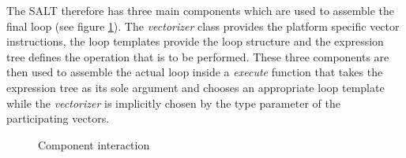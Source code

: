 \documentclass[12pt]{article}
\begin{document}
The SALT therefore has three main components which are used to assemble
the final loop (see figure \ref{components}). The \emph{vectorizer} class provides the platform specific
vector instructions, the loop templates provide the loop structure and the
expression tree defines the operation that is to be performed. These three
components are then used to assemble the actual loop inside a \emph{execute}
function that takes the expression tree as its sole argument and chooses
an appropriate loop template while the \emph{vectorizer} is implicitly chosen
by the type parameter of the participating vectors.

\begin{figure}
  \begin{center}

    \caption{Component interaction}
    \label{components}

  \end{center}
\end{figure}
\end{document}
